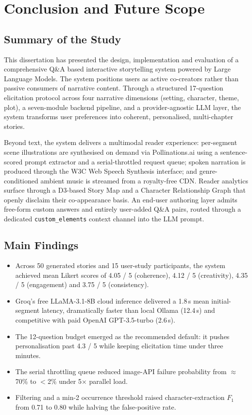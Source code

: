 \chapter{Conclusion and Future Scope}
\label{ch:conclusion}

\section{Summary of the Study}
This dissertation has presented the design, implementation and
evaluation of a comprehensive Q\&A based interactive storytelling
system powered by Large Language Models. The system positions users
as active co-creators rather than passive consumers of narrative
content. Through a structured 17-question elicitation protocol
across four narrative dimensions (setting, character, theme, plot),
a seven-module backend pipeline, and a provider-agnostic LLM layer,
the system transforms user preferences into coherent, personalised,
multi-chapter stories.

Beyond text, the system delivers a multimodal reader experience:
per-segment scene illustrations are synthesised on demand via
Pollinations.ai using a sentence-scored prompt extractor and a
serial-throttled request queue; spoken narration is produced through
the W3C Web Speech Synthesis interface; and genre-conditioned ambient
music is streamed from a royalty-free CDN. Reader analytics surface
through a D3-based Story Map and a Character Relationship Graph
that openly disclaim their co-appearance basis. An end-user
authoring layer admits free-form custom answers and entirely
user-added Q\&A pairs, routed through a dedicated
\texttt{custom\_elements} context channel into the LLM prompt.

\section{Main Findings}
\begin{itemize}
    \item Across 50 generated stories and 15 user-study participants,
    the system achieved mean Likert scores of 4.05 / 5 (coherence),
    4.12 / 5 (creativity), 4.35 / 5 (engagement) and 3.75 / 5
    (consistency).
    \item Groq's free LLaMA-3.1-8B cloud inference delivered a 1.8\,s
    mean initial-segment latency, dramatically faster than local
    Ollama (12.4\,s) and competitive with paid OpenAI GPT-3.5-turbo
    (2.6\,s).
    \item The 12-question budget emerged as the recommended default:
    it pushes personalisation past 4.3 / 5 while keeping elicitation
    time under three minutes.
    \item The serial throttling queue reduced image-API failure
    probability from $\approx$70\% to $<$2\% under 5$\times$ parallel
    load.
    \item Filtering and a min-2 occurrence threshold raised
    character-extraction $F_1$ from 0.71 to 0.80 while halving the
    false-positive rate.
\end{itemize}

